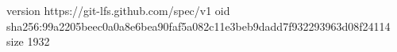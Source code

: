 version https://git-lfs.github.com/spec/v1
oid sha256:99a2205beec0a0a8e6bea90faf5a082c11e3beb9dadd7f932293963d08f24114
size 1932

